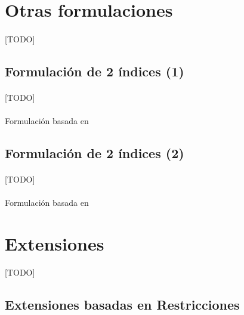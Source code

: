 \documentclass{subfiles}
\begin{document}
    \section{Otras formulaciones}
    \label{sec:formulation_other_formulations}

      \paragraph{}
      [TODO]

      \subsection{Formulación de 2 índices (1)}
      \label{sec:formulation_two_index_1_formulation}

        \paragraph{}
        [TODO]

        \paragraph{}
        Formulación basada en \cite{ropke2007models}

        \subsection{Formulación de 2 índices (2)}
      \label{sec:formulation_two_index_2_formulation}

        \paragraph{}
        [TODO]

        \paragraph{}
        Formulación basada en \cite{ropke2007models}

    \section{Extensiones}
    \label{sec:formulation_extensions}
      [TODO]


      \subsection{Extensiones basadas en Restricciones}
      \label{sec:formulation_extensions_contraints}
\end{document}
